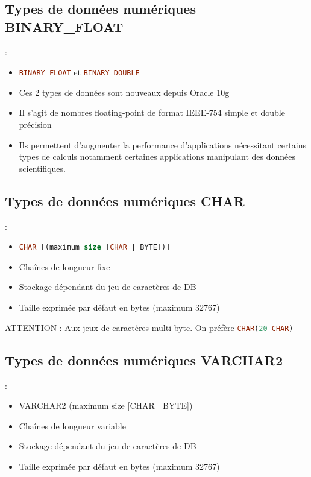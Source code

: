 \documentclass[10pt]{beamer}
\begin{document}
\subsection{Types de données numériques BINARY\_FLOAT}
\begin{frame}{\secname : \subsecname}
    \begin{itemize}
        \item \lstinline[language=sql]!BINARY_FLOAT! et \lstinline[language=sql]!BINARY_DOUBLE!
        \item Ces 2 types de données sont nouveaux depuis Oracle 10g
        \item Il s'agit de nombres floating-point de format IEEE-754 simple et double précision
        \item Ils permettent d'augmenter la performance d'applications nécessitant certains types de calculs notamment certaines applications manipulant des données scientifiques.
    \end{itemize}
\end{frame}

\subsection{Types de données numériques CHAR}
\begin{frame}{\secname : \subsecname}
    \begin{itemize}
        \item \lstinline[language=sql]!CHAR [(maximum size [CHAR | BYTE])]!
        \item Chaînes de longueur fixe
        \item Stockage dépendant du jeu de caractères de DB
        \item Taille exprimée par défaut en bytes (maximum 32767)
    \end{itemize}
    ATTENTION : Aux jeux de caractères multi byte. On préfère \lstinline[language=sql]!CHAR(20 CHAR)!
\end{frame}

\subsection{Types de données numériques VARCHAR2}
\begin{frame}{\secname : \subsecname}
    \begin{itemize}
        \item VARCHAR2 (maximum size [CHAR | BYTE])
        \item Chaînes de longueur variable
        \item Stockage dépendant du jeu de caractères de DB
        \item Taille exprimée par défaut en bytes (maximum 32767)
    \end{itemize}
\end{frame}
\end{document}
